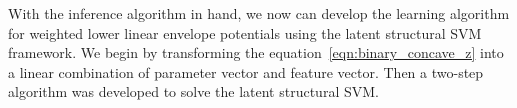 With the inference algorithm in hand, we now can develop the
learning algorithm for weighted lower linear envelope potentials
using the latent structural SVM framework. We begin by
transforming the equation~\eqref{eqn:binary_concave_z} into a
linear combination of parameter vector and feature vector. Then a
two-step algorithm was developed to solve the latent structural
SVM.








